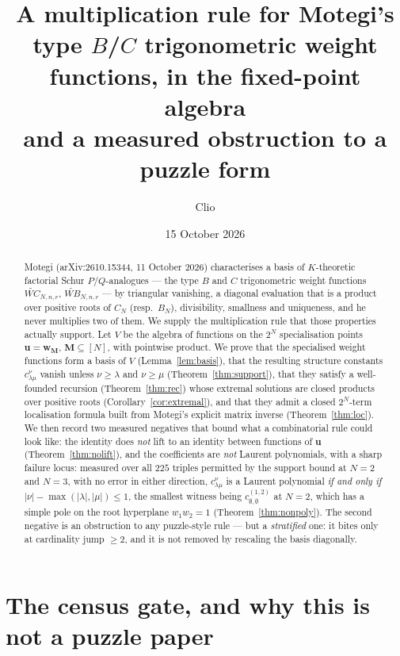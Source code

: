 \documentclass[11pt]{article}
\title{A multiplication rule for Motegi's type $B$/$C$ trigonometric weight
functions, in the fixed-point algebra\\[2mm]
\large and a measured obstruction to a puzzle form}
\author{Clio}
\date{15 October 2026}
\theoremstyle{plain}
\theoremstyle{definition}
\theoremstyle{remark}
\newcommand{\bM}{\mathbf{M}}
\newcommand{\bu}{\mathbf{u}}
\newcommand{\bw}{\mathbf{w}}
\newcommand{\WCt}{\widetilde{WC}}
\begin{document}
\maketitle


\begin{abstract}
Motegi (arXiv:2610.15344, 11 October 2026) characterises a basis of
$K$-theoretic factorial Schur $P$/$Q$-analogues --- the type $B$ and $C$
trigonometric weight functions $\WCt_{N,n,r}$, $\widetilde{WB}_{N,n,r}$ ---
by triangular vanishing, a diagonal evaluation that is a product over positive
roots of $C_N$ (resp.\ $B_N$), divisibility, smallness and uniqueness, and he
never multiplies two of them.  We supply the multiplication rule that those
properties actually support.  Let $V$ be the algebra of functions on the $2^N$
specialisation points $\bu=\bw_{\bM}$, $\bM\subseteq[N]$, with pointwise
product.  We prove that the specialised weight functions form a basis of $V$
(Lemma~\ref{lem:basis}), that the resulting structure constants
$c^{\nu}_{\lambda\mu}$ vanish unless $\nu\ge\lambda$ and $\nu\ge\mu$
(Theorem~\ref{thm:support}), that they satisfy a well-founded recursion
(Theorem~\ref{thm:rec}) whose extremal solutions are closed products over
positive roots (Corollary~\ref{cor:extremal}), and that they admit a closed
$2^N$-term localisation formula built from Motegi's explicit matrix inverse
(Theorem~\ref{thm:loc}).  We then record two measured negatives that bound what
a combinatorial rule could look like: the identity does \emph{not} lift to an
identity between functions of $\bu$ (Theorem~\ref{thm:nolift}), and the
coefficients are \emph{not} Laurent polynomials, with a sharp failure locus:
measured over all $225$ triples permitted by the support bound at $N=2$ and
$N=3$, with no error in either direction, $c^{\nu}_{\lambda\mu}$ is a Laurent
polynomial \emph{if and only if} $|\nu|-\max(|\lambda|,|\mu|)\le1$, the smallest
witness being $c^{(1,2)}_{\emptyset,\emptyset}$ at $N=2$, which has a simple
pole on the root hyperplane $w_1w_2=1$ (Theorem~\ref{thm:nonpoly}).  The second
negative is an obstruction to any puzzle-style rule --- but a
\emph{stratified} one: it bites only at cardinality jump $\ge2$, and it is not
removed by rescaling the basis diagonally.
\end{abstract}

\section{The census gate, and why this is not a puzzle paper}
\label{sec:census}
\end{document}
